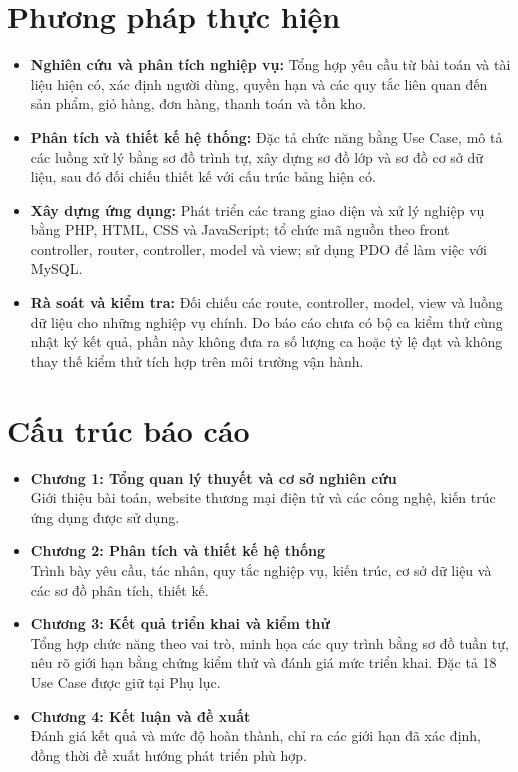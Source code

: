 \section{Phương pháp thực hiện}
\begin{itemize}
    \item \textbf{Nghiên cứu và phân tích nghiệp vụ:} Tổng hợp yêu cầu từ bài toán và tài liệu hiện có, xác định người dùng, quyền hạn và các quy tắc liên quan đến sản phẩm, giỏ hàng, đơn hàng, thanh toán và tồn kho.
    \item \textbf{Phân tích và thiết kế hệ thống:} Đặc tả chức năng bằng Use Case, mô tả các luồng xử lý bằng sơ đồ trình tự, xây dựng sơ đồ lớp và sơ đồ cơ sở dữ liệu, sau đó đối chiếu thiết kế với cấu trúc bảng hiện có.
    \item \textbf{Xây dựng ứng dụng:} Phát triển các trang giao diện và xử lý nghiệp vụ bằng PHP, HTML, CSS và JavaScript; tổ chức mã nguồn theo front controller, router, controller, model và view; sử dụng PDO để làm việc với MySQL.
    \item \textbf{Rà soát và kiểm tra:} Đối chiếu các route, controller, model, view và luồng dữ liệu cho những nghiệp vụ chính. Do báo cáo chưa có bộ ca kiểm thử cùng nhật ký kết quả, phần này không đưa ra số lượng ca hoặc tỷ lệ đạt và không thay thế kiểm thử tích hợp trên môi trường vận hành.
\end{itemize}


\section{Cấu trúc báo cáo}
\begin{itemize}
    \item \textbf{Chương 1: Tổng quan lý thuyết và cơ sở nghiên cứu} \\
    Giới thiệu bài toán, website thương mại điện tử và các công nghệ, kiến trúc ứng dụng được sử dụng.
    
    \item \textbf{Chương 2: Phân tích và thiết kế hệ thống} \\
    Trình bày yêu cầu, tác nhân, quy tắc nghiệp vụ, kiến trúc, cơ sở dữ liệu và các sơ đồ phân tích, thiết kế.
    
    \item \textbf{Chương 3: Kết quả triển khai và kiểm thử} \\
    Tổng hợp chức năng theo vai trò, minh họa các quy trình bằng sơ đồ tuần tự, nêu rõ giới hạn bằng chứng kiểm thử và đánh giá mức triển khai. Đặc tả 18 Use Case được giữ tại Phụ lục.
    
    \item \textbf{Chương 4: Kết luận và đề xuất} \\
    Đánh giá kết quả và mức độ hoàn thành, chỉ ra các giới hạn đã xác định, đồng thời đề xuất hướng phát triển phù hợp.
\end{itemize}

